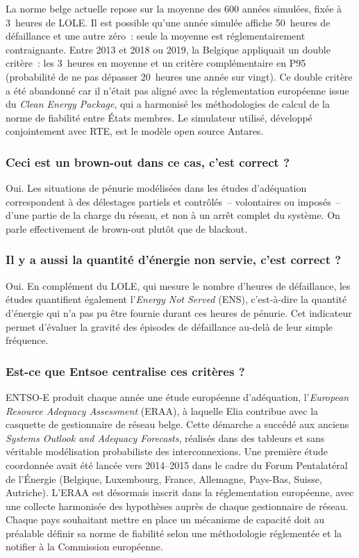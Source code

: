 La norme belge actuelle repose sur la moyenne des 600 années simulées, fixée à 3~heures de LOLE. Il est possible qu'une année simulée affiche 50~heures de défaillance et une autre zéro~: seule la moyenne est réglementairement contraignante. Entre 2013 et 2018 ou 2019, la Belgique appliquait un double critère~: les 3~heures en moyenne et un critère complémentaire en P95 (probabilité de ne pas dépasser 20~heures une année sur vingt). Ce double critère a été abandonné car il n'était pas aligné avec la réglementation européenne issue du \textit{Clean Energy Package}, qui a harmonisé les méthodologies de calcul de la norme de fiabilité entre États membres. Le simulateur utilisé, développé conjointement avec RTE, est le modèle open source Antares.

\subsubsection{Ceci est un brown-out dans ce cas, c'est correct ?}

Oui. Les situations de pénurie modélisées dans les études d'adéquation correspondent à des délestages partiels et contrôlés~-- volontaires ou imposés~-- d'une partie de la charge du réseau, et non à un arrêt complet du système. On parle effectivement de brown-out plutôt que de blackout.

\subsubsection{Il y a aussi la quantité d'énergie non servie, c'est correct ?}

Oui. En complément du LOLE, qui mesure le nombre d'heures de défaillance, les études quantifient également l'\textit{Energy Not Served} (ENS), c'est-à-dire la quantité d'énergie qui n'a pas pu être fournie durant ces heures de pénurie. Cet indicateur permet d'évaluer la gravité des épisodes de défaillance au-delà de leur simple fréquence.

\subsubsection{Est-ce que Entsoe centralise ces critères ?}

ENTSO-E produit chaque année une étude européenne d'adéquation, l'\textit{European Resource Adequacy Assessment} (ERAA), à laquelle Elia contribue avec la casquette de gestionnaire de réseau belge. Cette démarche a succédé aux anciens \textit{Systems Outlook and Adequacy Forecasts}, réalisés dans des tableurs et sans véritable modélisation probabiliste des interconnexions. Une première étude coordonnée avait été lancée vers 2014--2015 dans le cadre du Forum Pentalatéral de l'Énergie (Belgique, Luxembourg, France, Allemagne, Pays-Bas, Suisse, Autriche). L'ERAA est désormais inscrit dans la réglementation européenne, avec une collecte harmonisée des hypothèses auprès de chaque gestionnaire de réseau. Chaque pays souhaitant mettre en place un mécanisme de capacité doit au préalable définir sa norme de fiabilité selon une méthodologie réglementée et la notifier à la Commission européenne.

